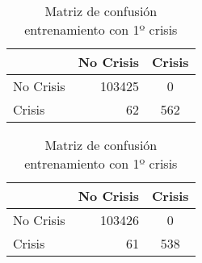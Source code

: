\begin{table}
\begin{center}
        \begin{subtable}[c]{0.4\textwidth}
            \begin{tabular}{lrc}
                \hline
                 & No Crisis & Crisis \\
                \hline
                No Crisis & 103425 & 0 \\
                Crisis & 62 & 562\\
                \hline
            \end{tabular}
            \label{tab:mat-conf-raw-1.3}
        \end{subtable}
        \hspace{1em}\vspace{1em}
        \begin{subtable}[c]{0.4\textwidth}
                \begin{tabular}{lrc}
                \hline
                 & No Crisis & Crisis \\
                \hline
                No Crisis & 103426 & 0 \\
                Crisis & 61 & 538\\
                \hline
            \end{tabular}
            \label{tab:mat-conf-stats-1.3}
        \end{subtable}
        \caption{Matriz de confusión entrenamiento con 1º crisis}
        \label{tab:matriz-conf-1a}
    \end{center}
\end{table}

